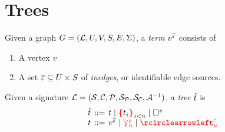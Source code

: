 \section{Trees}
\label{sec:trees}

\begin{definition}
  Given a graph $G = (\mathcal{L}, U, V, S, E, \Sigma)$,
  a \emph{term} $v^{\overline{\varepsilon}}$ consists of
  \begin{enumerate}
    \item A vertex $v$
    \item A set $\overline{\varepsilon} \subseteq U \times S$ of \emph{inedges}, or identifiable edge sources.
  \end{enumerate}
\end{definition}

\begin{definition}
  Given a signature $\mathcal{L} = (\mathcal{S}, \mathcal{C}, \mathcal{P}, \mathcal{S}_{\mathcal{P}}, \mathcal{S}_{\mathcal{C}}, \mathcal{A}^{-1})$,
  a \emph{tree} $\hat{t}$ is
  \[
    \arraycolsep=2pt
    \begin{array}{rcl}
      \tree & {::=} & t \mid \multichild{t_i}_{i < n} \mid \Hole^s             \\
      t     & {::=} & v^{\Set{\e}} \mid \multiparent{u}{\e} \mid \cycle{u}{\e} \\
    \end{array}
  \]
\end{definition}
